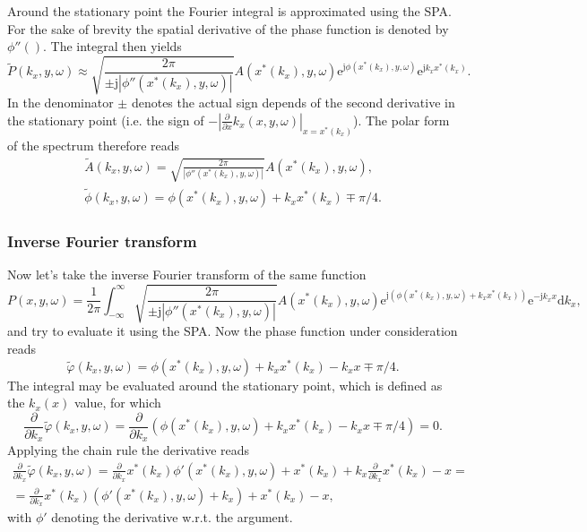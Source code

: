 \documentclass[12pt,a4paper]{article}
\newcommand{\td}{\mathrm{d}}
\newcommand{\te}{\mathrm{e}}
\newcommand{\ti}{\mathrm{j}}
\begin{document}
Around the stationary point the Fourier integral is approximated using the SPA. 
For the sake of brevity the spatial derivative of the phase function is denoted by $\phi''()$. The integral then yields
\begin{equation}
\tilde{P}(k_x,y,\omega) \approx 
\sqrt{ \frac{ 2\pi }
{ \pm \ti |\phi''(x^*(k_x),y,\omega)| }} 
A(x^*(k_x),y,\omega)\te^{\ti \phi(x^*(k_x),y,\omega)}\te^{\ti k_x x^*(k_x)}.
\end{equation}
In the denominator $\pm $ denotes the actual sign depends of the second derivative in the stationary point (i.e. the sign of $-\left| \frac{\partial}{\partial x}k_x(x,y,\omega	)\right|_{x = x^*(k_x)}$).
The polar form of the spectrum therefore reads
\begin{eqnarray}
\tilde{A}(k_x,y,\omega) = \sqrt{ \frac{ 2\pi }
{  |\phi''(x^*(k_x),y,\omega)| }} 
A(x^*(k_x),y,\omega),\\
\tilde{ \phi }(k_x,y,\omega) = \phi(x^*(k_x),y,\omega) + k_x x^*(k_x) \mp \pi /4.
\end{eqnarray}

\subsubsection*{Inverse Fourier transform}
Now let's take the inverse Fourier transform of the same function
\begin{equation}
P(x,y,\omega) = \frac{1}{2\pi} \int_{-\infty}^{\infty}\sqrt{ \frac{ 2\pi }
{ \pm \ti |\phi''(x^*(k_x),y,\omega)| }} 
A(x^*(k_x),y,\omega) \te^{\ti \left( \phi(x^*(k_x),y,\omega) + k_x x^*(k_x) \right)} \te^{-\ti k_x x} \td k_x,
\label{Eq:inverse_transform}
\end{equation}
and try to evaluate it using the SPA.
Now the phase function under consideration reads
\begin{equation}
\tilde{\varphi}(k_x, y,\omega) = \phi(x^*(k_x),y,\omega) + k_x x^*(k_x) - k_x x \mp \pi / 4.
\end{equation}
The integral may be evaluated around the stationary point, which is defined as the $k_x(x)$ value, for which
\begin{equation}
\frac{\partial}{\partial k_x} \tilde{\varphi}(k_x,y,\omega) = \frac{\partial}{\partial k_x} \left( \phi(x^*(k_x),y,\omega) + k_x x^*(k_x) - k_x x \mp \pi / 4 \right)
= 0.
\end{equation}
Applying the chain rule the derivative reads
\begin{multline}
\frac{\partial}{\partial k_x} \tilde{\varphi}(k_x,y,\omega) = \frac{\partial}{\partial k_x} x^*(k_x) \phi'(x^*(k_x),y,\omega) + x^*(k_x)+  k_x \frac{\partial}{\partial k_x}x^*(k_x) - x = \\
=
\frac{\partial}{\partial k_x} x^*(k_x) \left(\phi'(x^*(k_x),y,\omega)+ k_x \right) + x^*(k_x)  - x 
,
\end{multline}
with $\phi'$ denoting the derivative w.r.t. the argument.
\end{document}
